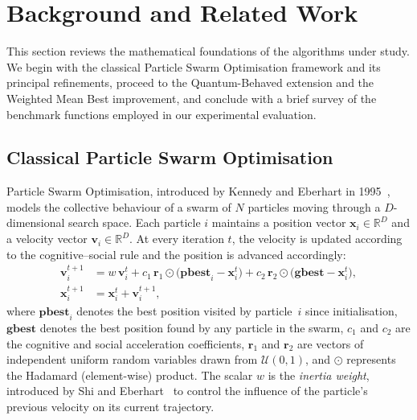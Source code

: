 \section{Background and Related Work}
\label{sec:background}

This section reviews the mathematical foundations of the algorithms under
study.  We begin with the classical Particle Swarm Optimisation framework and
its principal refinements, proceed to the Quantum-Behaved extension and the
Weighted Mean Best improvement, and conclude with a brief survey of the
benchmark functions employed in our experimental evaluation.

\subsection{Classical Particle Swarm Optimisation}
\label{sec:bg:pso}

Particle Swarm Optimisation, introduced by Kennedy and Eberhart in
1995~\cite{Kennedy1995}, models the collective behaviour of a swarm of
$N$ particles moving through a $D$-dimensional search space.  Each particle
$i$ maintains a position vector $\mathbf{x}_i \in \mathbb{R}^D$ and a
velocity vector $\mathbf{v}_i \in \mathbb{R}^D$.  At every iteration $t$, the
velocity is updated according to the cognitive--social rule and the position is
advanced accordingly:
\begin{align}
  \mathbf{v}_i^{t+1} &= w\,\mathbf{v}_i^{t}
    + c_1\,\mathbf{r}_1 \odot \bigl(\mathbf{pbest}_i - \mathbf{x}_i^{t}\bigr)
    + c_2\,\mathbf{r}_2 \odot \bigl(\mathbf{gbest} - \mathbf{x}_i^{t}\bigr),
  \label{eq:pso_velocity} \\[4pt]
  \mathbf{x}_i^{t+1} &= \mathbf{x}_i^{t} + \mathbf{v}_i^{t+1},
  \label{eq:pso_position}
\end{align}
where $\mathbf{pbest}_i$ denotes the best position visited by particle~$i$
since initialisation, $\mathbf{gbest}$ denotes the best position found by any
particle in the swarm, $c_1$ and $c_2$ are the cognitive and social
acceleration coefficients, $\mathbf{r}_1$ and $\mathbf{r}_2$ are vectors of
independent uniform random variables drawn from $\mathcal{U}(0,1)$, and
$\odot$ represents the Hadamard (element-wise) product.  The scalar $w$ is the
\emph{inertia weight}, introduced by Shi and Eberhart~\cite{Shi1998} to
control the influence of the particle's previous velocity on its current
trajectory.

